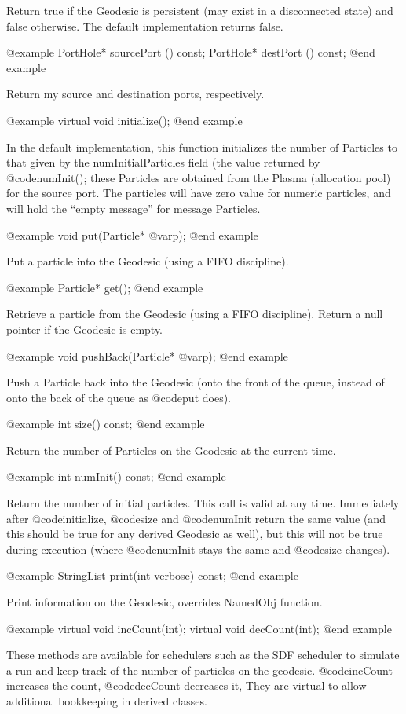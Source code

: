 Return true if the Geodesic is persistent (may exist in a disconnected
state) and false otherwise.  The default implementation returns false.

@example
PortHole* sourcePort () const;
PortHole* destPort () const;
@end example

Return my source and destination ports, respectively.

@example
virtual void initialize();
@end example

In the default implementation, this function initializes the number of
Particles to that given by the numInitialParticles field (the value
returned by @code{numInit()}; these Particles are obtained from the
Plasma (allocation pool) for the source port.  The particles will
have zero value for numeric particles, and will hold the ``empty message''
for message Particles.

@example
void put(Particle* @var{p});
@end example

Put a particle into the Geodesic (using a FIFO discipline).

@example
Particle* get();
@end example

Retrieve a particle from the Geodesic (using a FIFO discipline).
Return a null pointer if the Geodesic is empty.

@example
void pushBack(Particle* @var{p});
@end example

Push a Particle back into the Geodesic (onto the front of the queue,
instead of onto the back of the queue as @code{put} does).

@example
int size() const;
@end example

Return the number of Particles on the Geodesic at the current time.

@example
int numInit() const;
@end example

Return the number of initial particles.  This call is valid at any
time.  Immediately after @code{initialize}, @code{size} and
@code{numInit} return the same value (and this should be true for
any derived Geodesic as well), but this will not be true during
execution (where @code{numInit} stays the same and @code{size}
changes).

@example
StringList print(int verbose) const;
@end example

Print information on the Geodesic, overrides NamedObj function.

@example
virtual void incCount(int);
virtual void decCount(int);
@end example

These methods are available for schedulers such as the SDF scheduler to
simulate a run and keep track of the number of particles on the
geodesic.  @code{incCount} increases the count, @code{decCount}
decreases it, They are virtual to allow additional bookkeeping in
derived classes.

